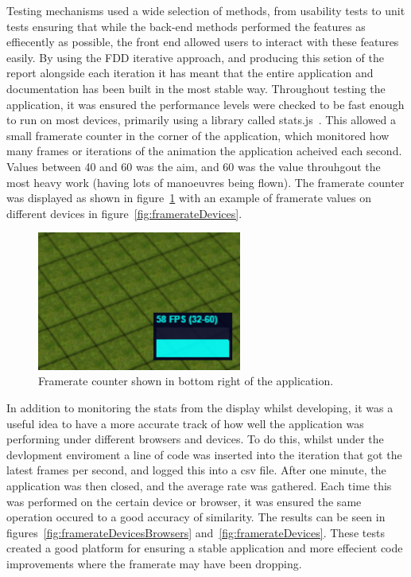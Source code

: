 Testing mechanisms used a wide selection of methods, from usability tests to unit tests ensuring that while the back-end methods performed the features as effiecently as possible, the front end allowed users to interact with these features easily. By using the FDD iterative approach, and producing this setion of the report alongside each iteration it has meant that the entire application and documentation has been built in the most stable way. Throughout testing the application, it was ensured the performance levels were checked to be fast enough to run on most devices, primarily using a library called stats.js~\cite{stats}. This allowed a small framerate counter in the corner of the application, which monitored how many frames or iterations of the animation the application acheived each second. Values between 40 and 60 was the aim, and 60 was the value throuhgout the most heavy work (having lots of manoeuvres being flown). The framerate counter was displayed as shown in figure~\ref{fig:framerate} with an example of framerate values on different devices in figure~\ref{fig:framerateDevices}.

\begin{figure}[h]
  \centering
      \includegraphics[width=0.6\textwidth]{images/framerate.png}
  \caption{Framerate counter shown in bottom right of the application.}
  \label{fig:framerate}
\end{figure}

In addition to monitoring the stats from the display whilst developing, it was a useful idea to have a more accurate track of how well the application was performing under different browsers and devices. To do this, whilst under the devlopment enviroment a line of code was inserted into the iteration that got the latest frames per second, and logged this into a csv file. After one minute, the application was then closed, and the average rate was gathered. Each time this was performed on the certain device or browser, it was ensured the same operation occured to a good accuracy of similarity. The results can be seen in figures~\ref{fig:framerateDevicesBrowsers} and~\ref{fig:framerateDevices}. These tests created a good platform for ensuring a stable application and more effecient code improvements where the framerate may have been dropping.

